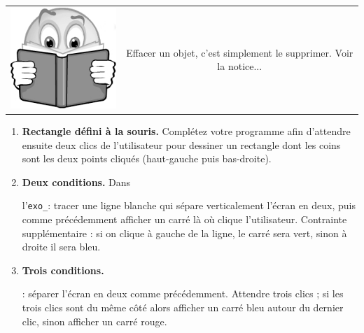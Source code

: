 \documentclass[11pt,a4paper]{article}
\newcommand{\checkbox}{$\square$ \smallskip}
\newenvironment{lecture}{%
\smallskip
\begin{tabular}{c|c}
    \hspace{.03\textwidth} \includegraphics[width=.07\textwidth]{img/lecture.jpg} & 
\begin{minipage}{.85\textwidth}
}{%
\end{minipage}
\end{tabular}
}
\newcounter{exo} \setcounter{exo}{0}
\newenvironment{action}{%
    \begin{enumerate}[\numerotation] \addtocounter{exo}{-1}%
        }{%
    \end{enumerate}
}
\newcommand{\numexoa}{\theexo \addtocounter{exo}{1}}
\newcommand{\numerotation}{\checkbox \smallskip \numexoa.}
\newcounter{exoo} \setcounter{exoo}{0}
\newcommand{\numexo}{\theexoo}
\newcommand{\repexo}{{\tt exo_\numexo}}
\newcommand{\exoplus}{\addtocounter{exoo}{1}}
\begin{document}
\begin{lecture}
    Effacer un objet, c'est simplement le supprimer. Voir la notice...
\end{lecture}
\begin{action}

\item {\bf Rectangle défini à la souris.} Complétez votre programme afin d'attendre ensuite deux clics de l'utilisateur pour dessiner un rectangle dont les coins sont les deux points cliqués (haut-gauche puis bas-droite).

\item {\bf Deux conditions.} Dans \exoplus l'\repexo : tracer une ligne blanche qui sépare verticalement l'écran en deux, puis comme précédemment afficher un carré là où clique l'utilisateur. Contrainte supplémentaire : si on clique à gauche de la ligne, le carré sera vert, sinon à droite il sera bleu.
\item {\bf Trois conditions.} \exoplus \repexo : séparer l'écran en deux comme précédemment. Attendre trois clics ; si les trois clics sont du même côté alors afficher un carré bleu autour du dernier clic, sinon afficher un carré rouge.
\end{action}
\end{document}

